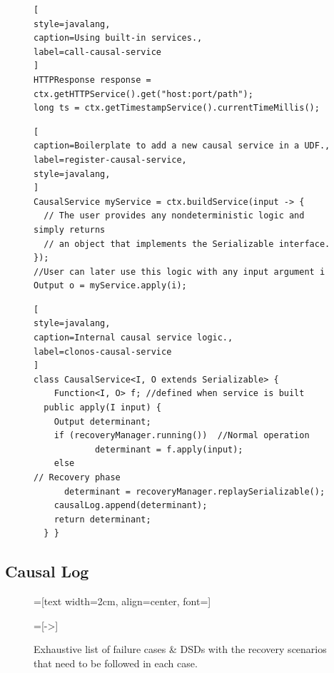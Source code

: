 \documentclass[sigconf]{acmart}
\begin{document}
\begin{figure}[t]
\begin{lstlisting}[
style=javalang,
caption=Using built-in services.,
label=call-causal-service
]
HTTPResponse response = ctx.getHTTPService().get("host:port/path");
long ts = ctx.getTimestampService().currentTimeMillis();
\end{lstlisting}

\begin{lstlisting}[
caption=Boilerplate to add a new causal service in a UDF.,
label=register-causal-service,
style=javalang, 
]
CausalService myService = ctx.buildService(input -> {
  // The user provides any nondeterministic logic and simply returns
  // an object that implements the Serializable interface.
});
//User can later use this logic with any input argument i
Output o = myService.apply(i);
\end{lstlisting}

\begin{lstlisting}[
style=javalang,
caption=Internal causal service logic.,
label=clonos-causal-service
]
class CausalService<I, O extends Serializable> {
	Function<I, O> f; //defined when service is built
  public apply(I input) {
    Output determinant;
    if (recoveryManager.running())	//Normal operation
			determinant = f.apply(input);
    else														// Recovery phase
      determinant = recoveryManager.replaySerializable();
    causalLog.append(determinant); 
    return determinant;
  } }
\end{lstlisting}
\vspace{-8mm}
\end{figure}

\subsection{Causal Log}
\label{sub:causal}

\begin{figure}

=[text width=2cm, 
                       align=center, 
                       font=\sffamily]

=[->]


\newcommand{\redtext}[1]{\color{red}\relscale{.7}\textit{#1}}

\vspace{-4mm}
\caption{Exhaustive list of failure cases \& DSDs with the recovery scenarios that need to be followed in each case.}
\label{fig:recovery-cases}
 \vspace{-2mm}
\end{figure}
\end{document}
